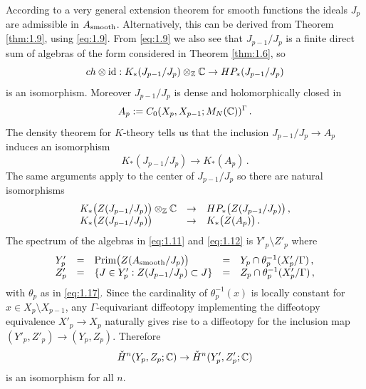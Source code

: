 According to a very general extension theorem for smooth functions
\cite[Theorem 0.2.1]{BiSc} the ideals $J_p$ are admissible in
$A_\mathrm{smooth}$. Alternatively, this can be derived from
Theorem \ref{thm:1.9}, using \eqref{eq:1.9}. From \eqref{eq:1.9} we
also see that $J_{p-1}/J_p$ is a finite direct sum of algebras
of the form considered in Theorem \ref{thm:1.6}, so
\begin{equation}
ch \otimes \mathrm{id} : K_* (J_{p-1}/J_p ) \otimes_{\mathbb Z} \mathbb C
\to HP_* (J_{p-1}/J_p )
\end{equation}
is an isomorphism. Moreover $J_{p-1}/J_p$ is dense and
holomorphically closed in
\[
A_p := C_0 (X_p , X_{p-1};M_N (\mathbb C ))^\Gamma \,.
\]
The density theorem for $K$-theory \cite[Th\'eor\`eme A.2.1]{Bost}
tells us that the inclusion $J_{p-1}/J_p \to A_p$ induces an
isomorphism
\begin{equation}\label{eq:1.11}
K_* (J_{p-1}/J_p ) \to K_* ( A_p ) \,.
\end{equation}
The same arguments apply to the center of $J_{p-1}/J_p$ so there
are natural isomorphisms
\begin{equation}\label{eq:1.12}
\begin{array}{lll}
K_* \big( Z (J_{p-1}/J_p ) \big) \otimes_{\mathbb Z} \mathbb C & \to &
HP_* \big( Z (J_{p-1}/J_p ) \big) \,, \\
K_* \big( Z (J_{p-1}/J_p ) \big) & \to & K_* \big( Z(A_p ) \big) \,.
\end{array}
\end{equation}
The spectrum of the algebras in \eqref{eq:1.11} and
\eqref{eq:1.12} is $Y'_p \setminus Z'_p$ where
\[
\begin{array}{lllll}
Y'_p & = & \mathrm{Prim}\big( Z (A_\mathrm{smooth} / J_p ) \big) &
= & Y_p \cap \theta_p^{-1} (X'_p / \Gamma ) \,, \\
Z'_p & = & \{ J \in Y'_p : Z (J_{p-1} / J_p ) \subset J \} &
= & Z_p \cap \theta_p^{-1} (X'_p / \Gamma ) \,,
\end{array}
\]
with $\theta_p$ as in \eqref{eq:1.17}. Since the cardinality of $\theta_p^{-1}(x)$ 
is locally constant for $x \in X_p \setminus X_{p-1}$, any $\Gamma$-equivariant 
diffeotopy implementing the diffeotopy equivalence $X'_p \to X_p$ naturally gives 
rise to a diffeotopy for the inclusion map $(Y'_p ,Z'_p ) \to (Y_p ,Z_p )$. Therefore
\begin{equation}
\check H^n (Y_p ,Z_p ;\mathbb C ) \to \check H^n (Y'_p ,Z'_p ;\mathbb C )
\end{equation}
is an isomorphism for all $n$.

